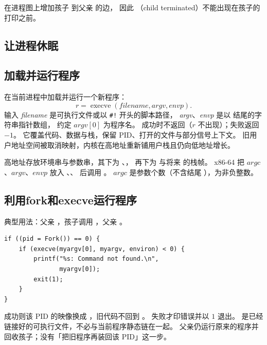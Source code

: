  在进程图上增加孩子  到父亲  的边，
因此 （child terminated）不能出现在孩子的打印之前。

\subsection{让进程休眠}

\pending

\subsection{加载并运行程序}

 在当前进程中加载并运行一个新程序：
\[
r=\operatorname{execve}(\textit{filename},\textit{argv},\textit{envp}).
\]
输入 \textit{filename} 是可执行文件或以 \texttt{\#!} 开头的脚本路径，
\textit{argv}、\textit{envp} 是以  结尾的字符串指针数组，
约定 $\textit{argv}[0]$ 为程序名。
成功时不返回（$r$ 不出现）；失败返回 $-1$。
它覆盖代码、数据与栈，保留 PID、打开的文件与部分信号上下文。
旧用户地址空间被取消映射，内核在高地址重新铺用户栈且仍向低地址增长。


高地址存放环境串与参数串，其下为 、，
再下为  与将来  的栈帧。
x86-64 把 $\textit{argc}$、$\textit{argv}$、$\textit{envp}$ 放入
、、 后调用 。
$\textit{argc}$ 是参数个数（不含结尾 ），为非负整数。

\subsection{利用fork和execve运行程序}


典型用法：父亲 ，孩子调用 ，父亲 。
\begin{lstlisting}
if ((pid = Fork()) == 0) {
    if (execve(myargv[0], myargv, environ) < 0) {
        printf("%s: Command not found.\n",
               myargv[0]);
        exit(1);
    }
}
\end{lstlisting}
成功则该 PID 的映像换成 ，旧代码不回到 。
失败才印错误并以 $1$ 退出。
 是已经链接好的可执行文件，不必与当前程序静态链在一起。
父亲仍运行原来的程序并回收孩子；没有「把旧程序再装回该 PID」这一步。

